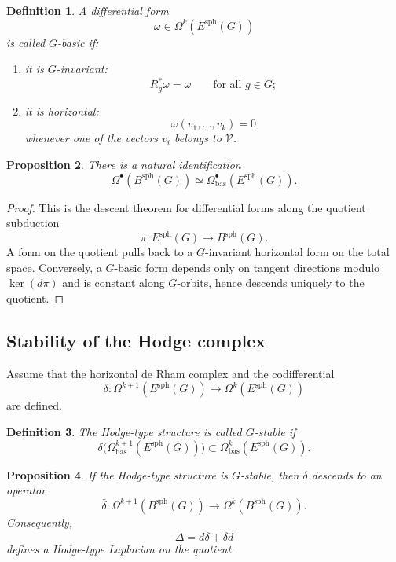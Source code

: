 \documentclass[11pt]{amsart}
\newtheorem{definition}{Definition}[section]
\newtheorem{proposition}[definition]{Proposition}
\begin{document}
\begin{definition}
A differential form
\[
\omega\in\Omega^k(E^{\mathrm{sph}}(G))
\]
is called \(G\)-basic if:
\begin{enumerate}
\item it is \(G\)-invariant:
\[
R_g^*\omega=\omega
\qquad
\text{for all }g\in G;
\]
\item it is horizontal:
\[
\omega(v_1,\ldots,v_k)=0
\]
whenever one of the vectors \(v_i\) belongs to \(\mathcal V\).
\end{enumerate}
\end{definition}

\begin{proposition}
There is a natural identification
\[
\Omega^\bullet(B^{\mathrm{sph}}(G))
\simeq
\Omega^\bullet_{\mathrm{bas}}(E^{\mathrm{sph}}(G)).
\]
\end{proposition}

\begin{proof}
This is the descent theorem for differential forms along the quotient
subduction
\[
\pi:E^{\mathrm{sph}}(G)\to B^{\mathrm{sph}}(G).
\]
A form on the quotient pulls back to a \(G\)-invariant horizontal form on the
total space. Conversely, a \(G\)-basic form depends only on tangent directions
modulo \(\ker(d\pi)\) and is constant along \(G\)-orbits, hence descends
uniquely to the quotient.
\end{proof}

\subsection{Stability of the Hodge complex}

Assume that the horizontal de Rham complex and the codifferential
\[
\delta:
\Omega^{k+1}(E^{\mathrm{sph}}(G))
\longrightarrow
\Omega^k(E^{\mathrm{sph}}(G))
\]
are defined.

\begin{definition}
The Hodge-type structure is called \(G\)-stable if
\[
\delta\bigl(
\Omega^{k+1}_{\mathrm{bas}}(E^{\mathrm{sph}}(G))
\bigr)
\subset
\Omega^k_{\mathrm{bas}}(E^{\mathrm{sph}}(G)).
\]
\end{definition}

\begin{proposition}
If the Hodge-type structure is \(G\)-stable, then \(\delta\) descends to an
operator
\[
\bar\delta:
\Omega^{k+1}(B^{\mathrm{sph}}(G))
\to
\Omega^k(B^{\mathrm{sph}}(G)).
\]
Consequently,
\[
\bar\Delta=d\bar\delta+\bar\delta d
\]
defines a Hodge-type Laplacian on the quotient.
\end{proposition}
\end{document}
